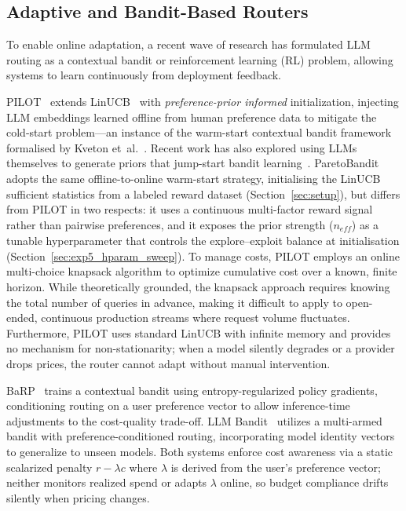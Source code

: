 \subsection{Adaptive and Bandit-Based Routers}

To enable online adaptation, a recent wave of research has formulated LLM routing as a contextual bandit or reinforcement learning (RL) problem, allowing systems to learn continuously from deployment feedback. 

PILOT~\cite{panda2025pilot} extends LinUCB~\cite{li2010contextual} with \emph{preference-prior informed} initialization, injecting LLM embeddings learned offline from human preference data to mitigate the cold-start problem---an instance of the warm-start contextual bandit framework formalised by Kveton et~al.~\cite{kveton2023warmstart}.  Recent work has also explored using LLMs themselves to generate priors that jump-start bandit learning~\cite{pan2024cbli}.  ParetoBandit adopts the same offline-to-online warm-start strategy, initialising the LinUCB sufficient statistics from a labeled reward dataset (Section~\ref{sec:setup}), but differs from PILOT in two respects: it uses a continuous multi-factor reward signal rather than pairwise preferences, and it exposes the prior strength ($n_\mathit{eff}$) as a tunable hyperparameter that controls the explore--exploit balance at initialisation (Section~\ref{sec:exp5_hparam_sweep}).
To manage costs, PILOT employs an online multi-choice knapsack algorithm to optimize cumulative cost over a known, finite horizon. While theoretically grounded, the knapsack approach requires knowing the total number of queries in advance, making it difficult to apply to open-ended, continuous production streams where request volume fluctuates.  Furthermore, PILOT uses standard LinUCB with infinite memory and provides no mechanism for non-stationarity; when a model silently degrades or a provider drops prices, the router cannot adapt without manual intervention.

BaRP~\cite{wang2025barp} trains a contextual bandit using entropy-regularized policy gradients, conditioning routing on a user preference vector to allow inference-time adjustments to the cost-quality trade-off. LLM Bandit~\cite{li2025llmbandit} utilizes a multi-armed bandit with preference-conditioned routing, incorporating model identity vectors to generalize to unseen models. Both systems enforce cost awareness via a static scalarized penalty $r - \lambda c$ where $\lambda$ is derived from the user's preference vector; neither monitors realized spend or adapts $\lambda$ online, so budget compliance drifts silently when pricing changes.

